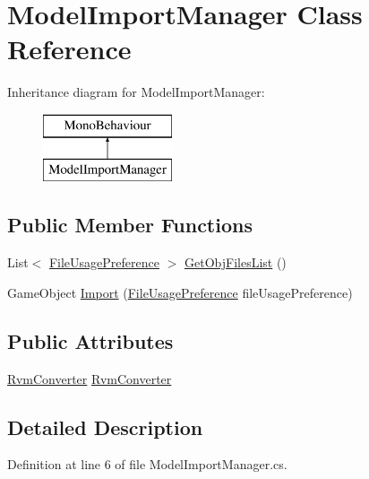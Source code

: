 \hypertarget{class_model_import_manager}{}\section{Model\+Import\+Manager Class Reference}
\label{class_model_import_manager}
Inheritance diagram for Model\+Import\+Manager\+:\begin{figure}[H]
\begin{center}
\leavevmode
\includegraphics[height=2.000000cm]{class_model_import_manager}
\end{center}
\end{figure}
\subsection*{Public Member Functions}
\begin{DoxyCompactItemize}
\item 
List$<$ \mbox{\hyperlink{class_file_usage_preference}{File\+Usage\+Preference}} $>$ \mbox{\hyperlink{class_model_import_manager_a6e6fafc0e15cc807f0a9687a5ac49823}{Get\+Obj\+Files\+List}} ()
\item 
Game\+Object \mbox{\hyperlink{class_model_import_manager_a7f3893bf9257d111ee24f45533deeb51}{Import}} (\mbox{\hyperlink{class_file_usage_preference}{File\+Usage\+Preference}} file\+Usage\+Preference)
\end{DoxyCompactItemize}
\subsection*{Public Attributes}
\begin{DoxyCompactItemize}
\item 
\mbox{\hyperlink{class_rvm_converter}{Rvm\+Converter}} \mbox{\hyperlink{class_model_import_manager_a033e080b994736360d2230a94b49a8f3}{Rvm\+Converter}}
\end{DoxyCompactItemize}


\subsection{Detailed Description}


Definition at line 6 of file Model\+Import\+Manager.\+cs.



